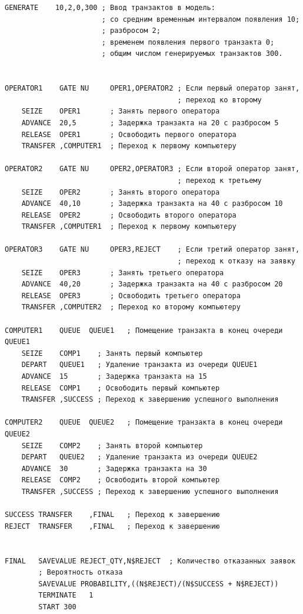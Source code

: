 \begin{lstlisting}[caption={Текст программы},label={lst:model}]
GENERATE	10,2,0,300 ; Ввод транзактов в модель:
	                   ; со средним временным интервалом появления 10;
		               ; разбросом 2;
		               ; временем появления первого транзакта 0;
		               ; общим числом генерируемых транзактов 300.


OPERATOR1    GATE NU 	 OPER1,OPERATOR2 ; Если первый оператор занят,
                                         ; переход ко второму
	SEIZE	 OPER1       ; Занять первого оператора
	ADVANCE	 20,5        ; Задержка транзакта на 20 с разбросом 5
	RELEASE	 OPER1       ; Освободить первого оператора
	TRANSFER ,COMPUTER1  ; Переход к первому компьютеру

OPERATOR2	 GATE NU	 OPER2,OPERATOR3 ; Если второй оператор занят,
                                         ; переход к третьему
	SEIZE	 OPER2       ; Занять второго оператора
	ADVANCE	 40,10       ; Задержка транзакта на 40 с разбросом 10
	RELEASE	 OPER2       ; Освободить второго оператора
	TRANSFER ,COMPUTER1  ; Переход к первому компьютеру

OPERATOR3	 GATE NU	 OPER3,REJECT    ; Если третий оператор занят,
                                         ; переход к отказу на заявку
	SEIZE	 OPER3       ; Занять третьего оператора
	ADVANCE	 40,20       ; Задержка транзакта на 40 с разбросом 20
	RELEASE	 OPER3       ; Освободить третьего оператора
	TRANSFER ,COMPUTER2  ; Переход ко второму компьютеру

COMPUTER1    QUEUE	QUEUE1   ; Помещение транзакта в конец очереди QUEUE1
	SEIZE	 COMP1    ; Занять первый компьютер
	DEPART	 QUEUE1   ; Удаление транзакта из очереди QUEUE1
	ADVANCE	 15       ; Задержка транзакта на 15		 
	RELEASE	 COMP1    ; Освободить первый компьютер
	TRANSFER ,SUCCESS ; Переход к завершению успешного выполнения

COMPUTER2	 QUEUE	QUEUE2   ; Помещение транзакта в конец очереди QUEUE2
	SEIZE 	 COMP2    ; Занять второй компьютер
	DEPART	 QUEUE2   ; Удаление транзакта из очереди QUEUE2
	ADVANCE	 30       ; Задержка транзакта на 30		
	RELEASE	 COMP2    ; Освободить второй компьютер
	TRANSFER ,SUCCESS ; Переход к завершению успешного выполнения

SUCCESS	TRANSFER 	,FINAL   ; Переход к завершению
REJECT	TRANSFER	,FINAL   ; Переход к завершению


FINAL	SAVEVALUE REJECT_QTY,N$REJECT  ; Количество отказанных заявок
        ; Вероятность отказа
    	SAVEVALUE PROBABILITY,((N$REJECT)/(N$SUCCESS + N$REJECT))
    	TERMINATE	1
    	START 300
\end{lstlisting}

